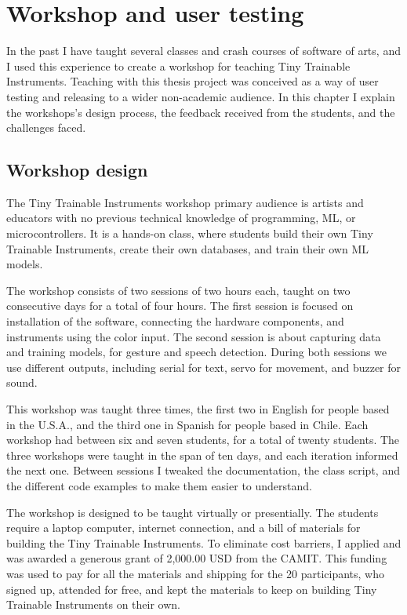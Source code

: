 \chapter{Workshop and user testing}

In the past I have taught several classes and crash courses of software of arts, and I used this experience to create a workshop for teaching Tiny Trainable Instruments. Teaching with this thesis project was conceived as a way of user testing and releasing to a wider non-academic audience. In this chapter I explain the workshops's design process, the feedback received from the students, and the challenges faced.

\section{Workshop design}

The Tiny Trainable Instruments workshop primary audience is artists and educators with no previous technical knowledge of programming, \acrshort{ML}, or microcontrollers. It is a hands-on class, where students build their own Tiny Trainable Instruments, create their own databases, and train their own \acrshort{ML} models.

The workshop consists of two sessions of two hours each, taught on two consecutive days for a total of four hours. The first session is focused on installation of the software, connecting the hardware components, and instruments using the color input. The second session is about capturing data and training models, for gesture and speech detection. During both sessions we use different outputs, including serial for text, servo for movement, and buzzer for sound.

This workshop was taught three times, the first two in English for people based in the U.S.A., and the third one in Spanish for people based in Chile. Each workshop had between six and seven students, for a total of twenty students. The three workshops were taught in the span of ten days, and each iteration informed the next one. Between sessions I tweaked the documentation, the class script, and the different code examples to make them easier to understand.

The workshop is designed to be taught virtually or presentially. The students require a laptop computer, internet connection, and a bill of materials for building the Tiny Trainable Instruments. To eliminate cost barriers, I applied and was awarded a generous grant of 2,000.00 USD from the \acrlong{CAMIT}. This funding was used to pay for all the materials and shipping for the 20 participants, who signed up, attended for free, and kept the materials to keep on building Tiny Trainable Instruments on their own.

